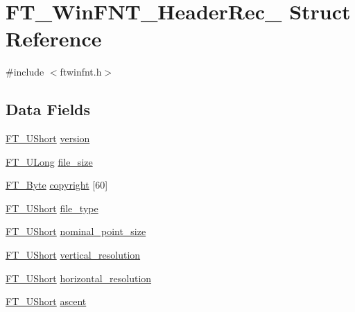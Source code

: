\hypertarget{struct_f_t___win_f_n_t___header_rec__}{}\section{F\+T\+\_\+\+Win\+F\+N\+T\+\_\+\+Header\+Rec\+\_\+ Struct Reference}
\label{struct_f_t___win_f_n_t___header_rec__}


{\ttfamily \#include $<$ftwinfnt.\+h$>$}

\subsection*{Data Fields}
\begin{DoxyCompactItemize}
\item 
\hyperlink{fttypes_8h_a937f6c17cf5ffd09086d8610c37b9f58}{F\+T\+\_\+\+U\+Short} \hyperlink{struct_f_t___win_f_n_t___header_rec___a88f8539fc11d2fac60f172553caa5b8d}{version}
\item 
\hyperlink{fttypes_8h_a4fac88bdba78eb76b505efa6e4fbf3f5}{F\+T\+\_\+\+U\+Long} \hyperlink{struct_f_t___win_f_n_t___header_rec___ae311838f941463d96f4ee570de58a359}{file\+\_\+size}
\item 
\hyperlink{fttypes_8h_a51f26183ca0c9f4af958939648caeccd}{F\+T\+\_\+\+Byte} \hyperlink{struct_f_t___win_f_n_t___header_rec___a289a835480eac30710dae8bfc04c6ae7}{copyright} \mbox{[}60\mbox{]}
\item 
\hyperlink{fttypes_8h_a937f6c17cf5ffd09086d8610c37b9f58}{F\+T\+\_\+\+U\+Short} \hyperlink{struct_f_t___win_f_n_t___header_rec___a0ca7a317967750673fd06f98af5f8329}{file\+\_\+type}
\item 
\hyperlink{fttypes_8h_a937f6c17cf5ffd09086d8610c37b9f58}{F\+T\+\_\+\+U\+Short} \hyperlink{struct_f_t___win_f_n_t___header_rec___a98fd9a9f31cdbdfa570fba3e0094dfdc}{nominal\+\_\+point\+\_\+size}
\item 
\hyperlink{fttypes_8h_a937f6c17cf5ffd09086d8610c37b9f58}{F\+T\+\_\+\+U\+Short} \hyperlink{struct_f_t___win_f_n_t___header_rec___ad8f76384c2eec492a559e66de170baba}{vertical\+\_\+resolution}
\item 
\hyperlink{fttypes_8h_a937f6c17cf5ffd09086d8610c37b9f58}{F\+T\+\_\+\+U\+Short} \hyperlink{struct_f_t___win_f_n_t___header_rec___a0adc07f0f285c8c2350c0078d71ace9a}{horizontal\+\_\+resolution}
\item 
\hyperlink{fttypes_8h_a937f6c17cf5ffd09086d8610c37b9f58}{F\+T\+\_\+\+U\+Short} \hyperlink{struct_f_t___win_f_n_t___header_rec___a99125a3ce627cd8295c50c6019ec2f42}{ascent}

\end{DoxyCompactItemize}
